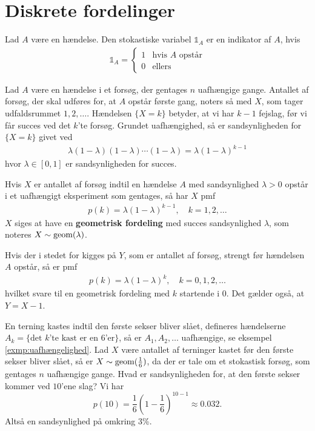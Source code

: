 \section{Diskrete fordelinger}
\begin{defn} [Indikator] %
Lad $A$ være en hændelse. Den stokastiske variabel $\mathbb{1}_A$ er en indikator af $A$, hvis
\begin{align*}
    \mathbb{1}_A=\begin{cases} 
      1 & \text{hvis } A \text{ opstår} \\
      0 & \text{ellers}
   \end{cases}
\end{align*}
\end{defn}

Lad $A$ være en hændelse i et forsøg, der gentages $n$ uafhængige gange. Antallet af forsøg, der skal udføres for, at $A$ opstår første gang, noters så med $X$, som tager udfaldsrummet $1,2,\ldots$. Hændelsen $\{X=k\}$ betyder, at vi har $k-1$ fejslag, før vi får succes ved det $k$'te forsøg. Grundet uafhængighed, så er sandsynligheden for $\{X=k\}$ givet ved
\begin{align*}
    \lambda(1-\lambda)(1-\lambda)\cdots (1-\lambda) =\lambda(1-\lambda)^{k-1}
\end{align*}
hvor $\lambda \in [0, 1]$ er sandsynligheden for succes.
\begin{defn} \label{def:2.14} %
Hvis $X$ er antallet af forsøg indtil en hændelse $A$ med sandsynlighed $\lambda>0$ opstår i et uafhængigt eksperiment som gentages, så har $X$ pmf 
\begin{align*}
    p(k)=\lambda(1-\lambda)^{k-1}, \quad k=1,2,\ldots 
\end{align*}
$X$ siges at have en \textbf{geometrisk fordeling} med succes sandsynlighed $\lambda$, som noteres $X\sim\textnormal{geom}(\lambda)$.
\end{defn}

Hvis der i stedet for kigges på $Y$, som er antallet af forsøg, strengt før hændelsen $A$ opstår, så er pmf
\begin{align*}
    p(k)=\lambda(1-\lambda)^{k}, \quad k=0,1,2,\ldots 
\end{align*}
hvilket svare til en geometrisk fordeling med $k$ startende i $0$. Det gælder også, at $Y=X-1$.

\begin{exmp}
En terning kastes indtil den første sekser bliver slået, defineres hændelserne $A_k = \{\text{det } k \text{'te kast er en 6'er}\}$, så er $A_1, A_2, \ldots$ uafhængige, se eksempel \ref{exmp:uafhængelighed}. Lad $X$ være antallet af terninger kastet før den første sekser bliver slået, så er $X \sim \textnormal{geom}(\tfrac{1}{6})$, da der er tale om et stokastisk forsøg, som gentages $n$ uafhængige gange. Hvad er sandsynligheden for, at den første sekser kommer ved $10$'ene slag? Vi har 
\begin{equation*}
    p(10) = \frac{1}{6} \left(1-\frac{1}{6}\right)^{10 - 1} \approx 0.032.
\end{equation*}
Altså en sandsynlighed på omkring 3\%.
\end{exmp}


